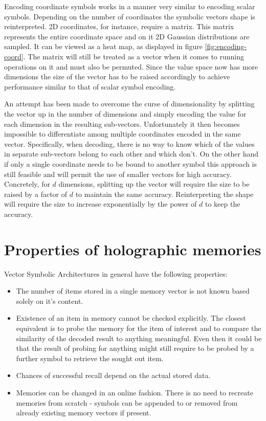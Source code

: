 \documentclass[journal]{journal}
\begin{document}
		Encoding coordinate symbols works in a manner very similar to encoding scalar symbols. Depending on the number of coordinates the symbolic vectors shape is reinterpreted. 2D coordinates, for instance, require a matrix. This matrix represents the entire coordinate space and on it 2D Gaussian distributions are sampled. It can be viewed as a heat map, as displayed in figure \ref{fig:encoding-coord}.	The matrix will still be treated as a vector when it comes to running operations on it and must also be permuted. Since the value space now has more dimensions the size of the vector has to be raised accordingly to achieve performance similar to that of scalar symbol encoding. 
		
		An attempt has been made to overcome the curse of dimensionality by splitting the vector up in the number of dimensions and simply encoding the value for each dimension in the resulting sub-vectors. Unfortunately it then becomes impossible to differentiate among multiple coordinates encoded in the same vector. Specifically, when decoding, there is no way to know which of the values in separate sub-vectors belong to each other and which don't. On the other hand if only a single coordinate needs to be bound to another symbol this approach is still feasible and will permit the use of smaller vectors for high accuracy. Concretely, for $d$ dimensions, splitting up the vector will require the size to be raised by a factor of $d$ to maintain the same accuracy. Reinterpreting the shape will require the size to increase exponentially by the power of $d$ to keep the accuracy.
			
	\section{Properties of holographic memories}
	
	Vector Symbolic Architectures in general have the following properties:
	\begin{itemize}
		\item The number of items stored in a single memory vector is not known based solely on it's content.
		\item Existence of an item in memory cannot be checked explicitly. The closest equivalent is to probe the memory for the item of interest and to compare the similarity of the decoded result to anything meaningful. Even then it could be that the result of probing for anything might still require to be probed by a further symbol to retrieve the sought out item.
		\item Chances of successful recall depend on the actual stored data.
		\item Memories can be changed in an online fashion. There is no need to recreate memories from scratch - symbols can be appended to or removed from already existing memory vectors if present.
	\end{itemize}
	
\end{document}
